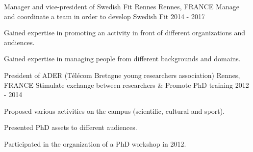 \begin{cventries}
  \cventry
    {Manager and vice-president of Swedish Fit Rennes}
    {Rennes, FRANCE}
    {Manage and coordinate a team in order to develop Swedish Fit}
    {2014 - 2017}
    {
      \begin{cvitems}
        \item {Gained expertise in promoting an activity in front of different organizations and audiences.}
        \item {Gained expertise in managing people from different backgrounds and domains.}
      \end{cvitems}
    }
  \cventry
    {President of ADER (T\'{e}l\'{e}com Bretagne young researchers association)}
    {Rennes, FRANCE}
    {Stimulate exchange between researchers \& Promote PhD training}
    {2012 - 2014}
    {
      \begin{cvitems}
        \item {Proposed various activities on the campus (scientific, cultural and sport).}
        \item {Presented PhD assets to different audiences.}
        \item {Participated in the organization of a PhD workshop in 2012.}
      \end{cvitems}
    }

\end{cventries}
